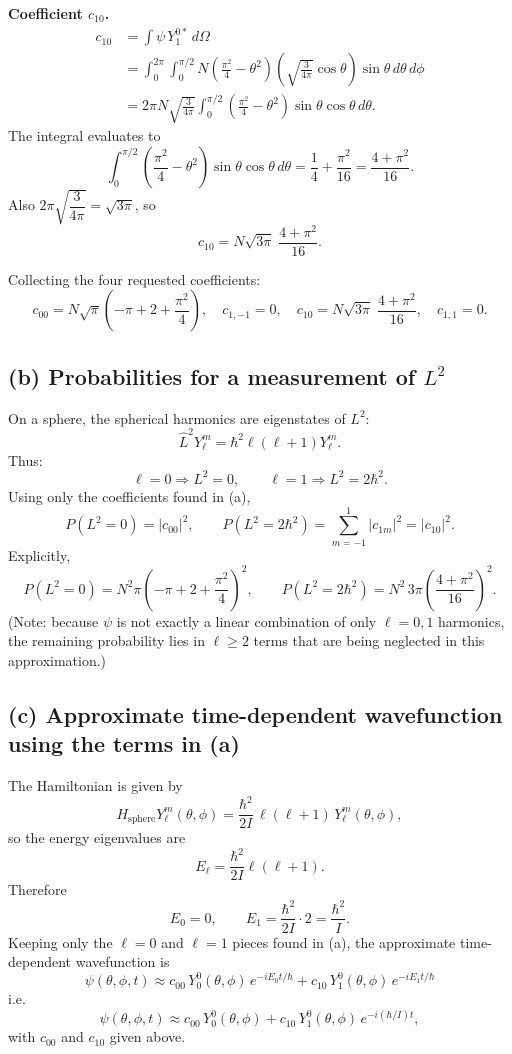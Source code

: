 \documentclass{article}
\begin{document}
\medskip
\noindent\textbf{Coefficient $c_{10}$.}
\begin{align*}
c_{10}
&=\int \psi\,Y_1^{0*}\,d\Omega\\
&=\int_0^{2\pi}\!\!\int_0^{\pi/2}
N\left(\frac{\pi^2}{4}-\theta^2\right)\left(\sqrt{\frac{3}{4\pi}}\cos\theta\right)\sin\theta\,d\theta\,d\phi\\
&=2\pi N\sqrt{\frac{3}{4\pi}}
\int_0^{\pi/2}\left(\frac{\pi^2}{4}-\theta^2\right)\sin\theta\cos\theta\,d\theta.
\end{align*}
The integral evaluates to
\[
\int_0^{\pi/2}\left(\frac{\pi^2}{4}-\theta^2\right)\sin\theta\cos\theta\,d\theta
=
\frac{1}{4}+\frac{\pi^2}{16}
=\frac{4+\pi^2}{16}.
\]
Also $2\pi\sqrt{\dfrac{3}{4\pi}}=\sqrt{3\pi}$, so
\[
\boxed{
c_{10}=N\sqrt{3\pi}\;\frac{4+\pi^2}{16}.
}
\]

Collecting the four requested coefficients:
\[
\boxed{
c_{00}=N\sqrt{\pi}\left(-\pi+2+\frac{\pi^2}{4}\right),\quad
c_{1,-1}=0,\quad
c_{10}=N\sqrt{3\pi}\;\frac{4+\pi^2}{16},\quad
c_{1,1}=0.
}
\]

\subsection*{(b) Probabilities for a measurement of $L^2$}

On a sphere, the spherical harmonics are eigenstates of $L^2$:
\[
\hat L^2 Y_\ell^m = \hbar^2\ell(\ell+1)Y_\ell^m.
\]
Thus:
\[
\ell=0 \Rightarrow L^2=0,\qquad
\ell=1 \Rightarrow L^2=2\hbar^2.
\]
Using only the coefficients found in (a),
\[
\boxed{
P(L^2=0)=|c_{00}|^2,
\qquad
P(L^2=2\hbar^2)=\sum_{m=-1}^1 |c_{1m}|^2 = |c_{10}|^2.
}
\]
Explicitly,
\[
\boxed{
P(L^2=0)=
N^2\pi\left(-\pi+2+\frac{\pi^2}{4}\right)^2,
\qquad
P(L^2=2\hbar^2)=
N^2\,3\pi\left(\frac{4+\pi^2}{16}\right)^2.
}
\]
(Note: because $\psi$ is not exactly a linear combination of only $\ell=0,1$ harmonics, the
remaining probability lies in $\ell\ge 2$ terms that are being neglected in this approximation.)

\subsection*{(c) Approximate time-dependent wavefunction using the terms in (a)}

The Hamiltonian is given by
\[
H_{\text{sphere}}Y_\ell^m(\theta,\phi)=\frac{\hbar^2}{2I}\,\ell(\ell+1)\,Y_\ell^m(\theta,\phi),
\]
so the energy eigenvalues are
\[
E_\ell=\frac{\hbar^2}{2I}\ell(\ell+1).
\]
Therefore
\[
E_0=0,\qquad
E_1=\frac{\hbar^2}{2I}\cdot 2=\frac{\hbar^2}{I}.
\]
Keeping only the $\ell=0$ and $\ell=1$ pieces found in (a), the approximate time-dependent
wavefunction is
\[
\boxed{
\psi(\theta,\phi,t)\approx
c_{00}\,Y_0^0(\theta,\phi)\,e^{-iE_0 t/\hbar}
+
c_{10}\,Y_1^0(\theta,\phi)\,e^{-iE_1 t/\hbar}
}
\]
i.e.
\[
\boxed{
\psi(\theta,\phi,t)\approx
c_{00}\,Y_0^0(\theta,\phi)
+
c_{10}\,Y_1^0(\theta,\phi)\,e^{-i(\hbar/I)t},
}
\]
with $c_{00}$ and $c_{10}$ given above.

\newpage
\end{document}
